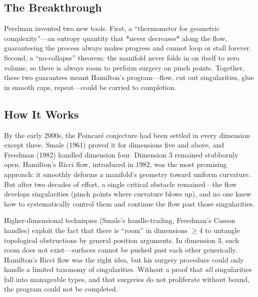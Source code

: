 \subsection{The Breakthrough}
Perelman invented two new tools. First, a ``thermometer for geometric complexity''---an entropy quantity that *never decreases* along the flow, guaranteeing the process always makes progress and cannot loop or stall forever. Second, a ``no-collapse'' theorem: the manifold never folds in on itself to zero volume, so there is always room to perform surgery on pinch points. Together, these two guarantees meant Hamilton's program---flow, cut out singularities, glue in smooth caps, repeat---could be carried to completion.

\subsection{How It Works}

By the early 2000s, the Poincar\'e conjecture had been settled in every dimension except three. Smale (1961) proved it for dimensions five and above, and Freedman (1982) handled dimension four. Dimension 3 remained stubbornly open. Hamilton's Ricci flow, introduced in 1982, was the most promising approach: it smoothly deforms a manifold's geometry toward uniform curvature. But after two decades of effort, a single critical obstacle remained---the flow develops singularities (pinch points where curvature blows up), and no one knew how to systematically control them and continue the flow past those singularities.

Higher-dimensional techniques (Smale's handle-trading, Freedman's Casson handles) exploit the fact that there is ``room'' in dimensions $\geq 4$ to untangle topological obstructions by general position arguments. In dimension 3, such room does not exist---surfaces cannot be pushed past each other generically. Hamilton's Ricci flow was the right idea, but his surgery procedure could only handle a limited taxonomy of singularities. Without a proof that \emph{all} singularities fall into manageable types, and that surgeries do not proliferate without bound, the program could not be completed.

